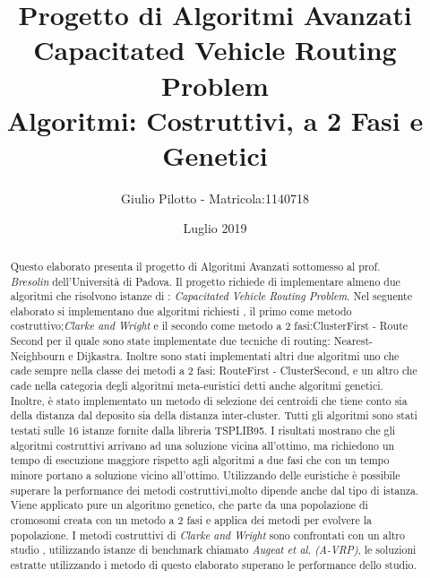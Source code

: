 \documentclass[]{article}
\title{Progetto di Algoritmi Avanzati  	
		\\ \large Capacitated Vehicle Routing Problem 
		 \\  Algoritmi: Costruttivi, a 2 Fasi e Genetici}
\author{Giulio Pilotto - Matricola:1140718}
\date{Luglio 2019}
\begin{document}
	



\maketitle


\begin{abstract}

Questo elaborato presenta il progetto di Algoritmi Avanzati sottomesso al prof. \textit{Bresolin} dell'Università di Padova.
Il progetto richiede di implementare almeno due algoritmi che risolvono istanze di : \textit{Capacitated Vehicle Routing Problem}.
Nel seguente elaborato si implementano due algoritmi richiesti , il primo come metodo costruttivo;\textit{Clarke and Wright} e il secondo come metodo a 2 fasi:ClusterFirst - Route Second per il quale sono state implementate due tecniche di routing: Nearest-Neighbourn e Dijkastra.
Inoltre sono  stati implementati altri due algoritmi uno che cade sempre nella classe dei metodi a 2 fasi: RouteFirst - ClusterSecond, e un altro che cade nella categoria degli algoritmi meta-euristici detti anche algoritmi genetici.
Inoltre, è stato implementato un metodo di selezione dei centroidi che tiene conto sia della distanza dal deposito sia della distanza inter-cluster.
Tutti gli algoritmi sono stati testati sulle 16 istanze fornite dalla libreria TSPLIB95.
I risultati mostrano che gli algoritmi costruttivi arrivano ad una soluzione vicina all'ottimo, ma richiedono un tempo di esecuzione maggiore rispetto agli algoritmi a due fasi che con un tempo minore portano a soluzione vicino all'ottimo.
Utilizzando delle euristiche è possibile superare la performance dei metodi costruttivi,molto dipende anche dal tipo di istanza.
Viene applicato pure un algoritmo genetico, che parte da una popolazione di cromosomi creata con un metodo a 2 fasi e applica dei metodi per evolvere la popolazione.
I metodi costruttivi di \textit{ Clarke and Wright} sono confrontati con un altro studio \cite{studio}, utilizzando istanze  di benchmark chiamato \textit{Augeat et al.}  \emph{(A-VRP)}, le soluzioni estratte utilizzando i metodo di questo elaborato superano le performance dello studio.

\end{abstract}
\end{document}
